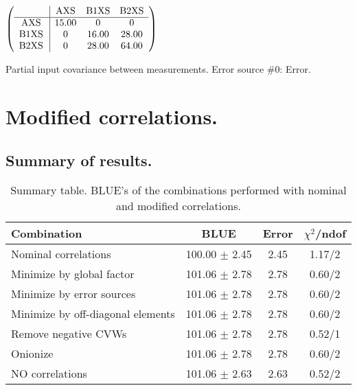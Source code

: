 \begin{table}[H]
\scriptsize
\begin{center}
\renewcommand{\arraystretch}{1.1}
\begin{math}\left(\begin{array}{c|ccc}
 & \mathrm{AXS} & 
\mathrm{B1XS} & 
\mathrm{B2XS} \\
\hline
\mathrm{AXS} \hspace*{2pt} &      15.00 &  0 &  0 \\
\mathrm{B1XS} \hspace*{2pt} &  0 &      16.00 &      28.00 \\
\mathrm{B2XS} \hspace*{2pt} &  0 &      28.00 &      64.00 \\
\end{array}\right)\end{math}
\caption{Partial input covariance between measurements. Error source \#0: Error.}
\renewcommand{\arraystretch}{1}
\end{center}
\end{table}
\clearpage
\section{Modified correlations.}
\subsection{Summary of results.}
\begin{table}[h]
\scriptsize
\begin{center}
\renewcommand{\arraystretch}{1.1}
\begin{tabular}{|l|c|c|c|}
\hline
Combination & BLUE & {\tiny Error} & {\tiny$\chi^2$/ndof} \\
\hline
Nominal correlations &     100.00 $\pm$      2.45 &       2.45 &       1.17/2\\
\hline
Minimize by global factor &     101.06 $\pm$      2.78 &       2.78 &       0.60/2\\
Minimize by error sources &     101.06 $\pm$      2.78 &       2.78 &       0.60/2\\
Minimize by off-diagonal elements &     101.06 $\pm$      2.78 &       2.78 &       0.60/2\\
Remove negative CVWs &     101.06 $\pm$      2.78 &       2.78 &       0.52/1\\
Onionize &     101.06 $\pm$      2.78 &       2.78 &       0.60/2\\
\hline
NO correlations &     101.06 $\pm$      2.63 &       2.63 &       0.52/2\\
\hline
\end{tabular}
\renewcommand{\arraystretch}{1}
\caption{Summary table. BLUE's of the combinations performed with nominal and modified correlations.}
\end{center}
\end{table}

